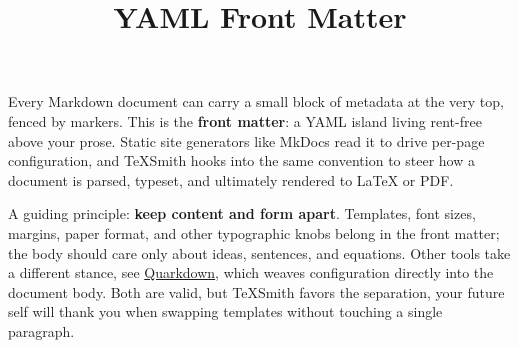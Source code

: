 \documentclass[a4paper,twoside]{article}
\title{YAML Front Matter}
\author{}\date{}
\begin{document}
\maketitle
Every Markdown document can carry a small block of metadata at the very top, fenced by \tscodeinline{-\allowbreak{}-\allowbreak{}-\allowbreak{}} markers. This is the \textbf{front matter}: a YAML island living rent-free above your prose. Static site generators like MkDocs read it to drive per-page configuration, and TeXSmith hooks into the same convention to steer how a document is parsed, typeset, and ultimately rendered to \LaTeX{} or PDF.

A guiding principle: \textbf{keep content and form apart}. Templates, font sizes, margins, paper format, and other typographic knobs belong in the front matter; the body should care only about ideas, sentences, and equations. Other tools take a different stance, see \href{https://quarkdown.com/}{Quarkdown}, which weaves configuration directly into the document body. Both are valid, but TeXSmith favors the separation, your future self will thank you when swapping templates without touching a single paragraph.
\end{document}
